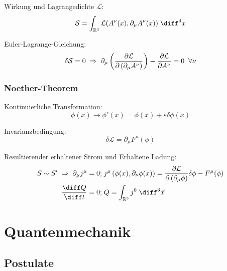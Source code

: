 \documentclass[11pt]{article}
\numberwithin{equation}{section}
\begin{document}
      Wirkung und Lagrangedichte $\mathcal{L}$:
      \begin{equation}
        \mathcal{S} = \int_{\mathbb{R}^4} \mathcal{L}(A^\nu(x),\partial_\mu A^\nu(x)) \;\diff^4 x
      \end{equation}

      Euler-Lagrange-Gleichung:
      \begin{equation}
        \delta\mathcal{S} = 0
        \;\Rightarrow\; \partial_\mu \left(\frac{\partial \mathcal{L}}{\partial \left(\partial_\mu A^\nu\right)}\right) - \frac{\partial \mathcal{L}}{\partial A^\nu} = 0 \;\;\forall \nu
      \end{equation}

      \subsubsection{Noether-Theorem}
      Kontinuierliche Transformation:
      \begin{equation}
        \phi(x)\rightarrow\phi'(x) = \phi(x) + \varepsilon \delta \phi(x)
      \end{equation}

      Invarianzbedingung:
      \begin{equation}
        \delta\mathcal{L} = \partial_\mu F^\mu(\phi)
      \end{equation}

      Resultierender erhaltener Strom und Erhaltene Ladung:
      \begin{equation}
        \begin{aligned}
          S \sim S' \;\Rightarrow\;\partial_\mu j^\mu = 0;&\; j^\mu \left( \phi(x), \partial_\nu\phi(x) \right) = \pder{\mathcal{L}}{\left(\partial_\mu \phi\right)}\delta\phi - F^\mu(\phi) \\
          \tder{Q}{t} = 0;&\; Q = \int_{\mathbb{R}^3} j^0\;\diff^3\vec{x}
        \end{aligned}
      \end{equation}



  \newpage
	\section{Quantenmechanik}
    \subsection{Postulate}
\end{document}
